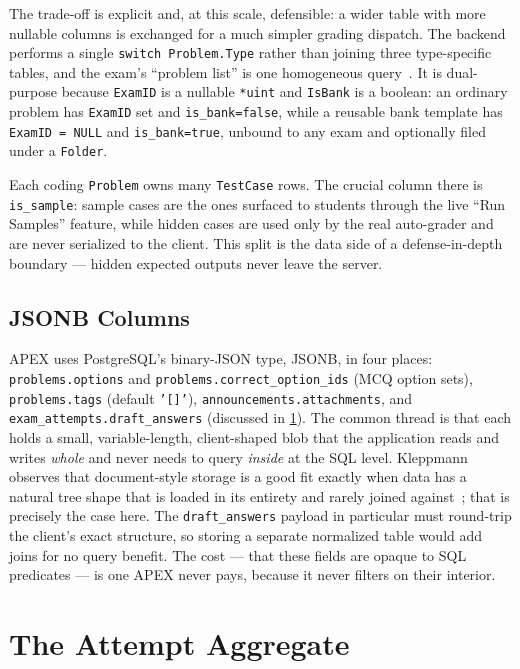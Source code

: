 The trade-off is explicit and, at this scale, defensible: a wider table with
more nullable columns is exchanged for a much simpler grading dispatch. The
backend performs a single \texttt{switch Problem.Type} rather than joining
three type-specific tables, and the exam's ``problem list'' is one
homogeneous query~\cite{fowler2002patterns}. It is dual-purpose because
\texttt{ExamID} is a nullable \texttt{*uint} and \texttt{IsBank} is a
boolean: an ordinary problem has \texttt{ExamID} set and
\texttt{is\_bank=false}, while a reusable bank template has
\texttt{ExamID = NULL} and \texttt{is\_bank=true}, unbound to any exam and
optionally filed under a \texttt{Folder}.

Each coding \texttt{Problem} owns many \texttt{TestCase} rows. The crucial
column there is \texttt{is\_sample}: sample cases are the ones surfaced to
students through the live ``Run Samples'' feature, while hidden cases are used
only by the real auto-grader and are never serialized to the client. This
split is the data side of a defense-in-depth boundary --- hidden expected
outputs never leave the server.

\subsection{JSONB Columns}\label{sec:jsonb}

APEX uses PostgreSQL's binary-JSON type, JSONB, in four places:
\texttt{problems.options} and \texttt{problems.correct\_option\_ids} (MCQ
option sets), \texttt{problems.tags} (default \texttt{'[]'}),
\texttt{announcements.attachments}, and \texttt{exam\_attempts.draft\_answers}
(discussed in \cref{sec:attempt-aggregate}). The common thread is that each
holds a small, variable-length, client-shaped blob that the application reads
and writes \emph{whole} and never needs to query \emph{inside} at the SQL
level. Kleppmann observes that document-style storage is a good fit exactly
when data has a natural tree shape that is loaded in its entirety and rarely
joined against~\cite{kleppmann2017ddia}; that is precisely the case here. The
\texttt{draft\_answers} payload in particular must round-trip the client's
exact structure, so storing a separate normalized table would add joins for
no query benefit. The cost --- that these fields are opaque to SQL
predicates --- is one APEX never pays, because it never filters on their
interior.

\section{The Attempt Aggregate}\label{sec:attempt-aggregate}

